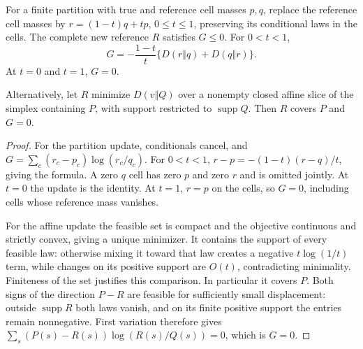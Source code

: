 \begin{lemma}\label{lem:v12-update}
For a finite partition with true and reference cell masses $p,q$, replace the reference
cell masses by $r=(1-t)q+tp$, $0\leq t\leq1$, preserving its conditional laws in the cells.
The complete new reference $R$ satisfies $G\leq0$. For $0<t<1$,
\[
 G=-\frac{1-t}{t}\{D(r\Vert q)+D(q\Vert r)\}.
\]
At $t=0$ and $t=1$, $G=0$.

Alternatively, let $R$ minimize $D(v\Vert Q)$ over a nonempty closed affine slice of
the simplex containing $P$, with support restricted to $\operatorname{supp}Q$.
Then $R$ covers $P$ and $G=0$.
\end{lemma}
\begin{proof}
For the partition update, conditionals cancel, and
$G=\sum_c(r_c-p_c)\log(r_c/q_c)$.
For $0<t<1$, $r-p=-(1-t)(r-q)/t$, giving the formula. A zero $q$ cell has zero
$p$ and zero $r$ and is omitted jointly. At $t=0$ the update is the identity.
At $t=1$, $r=p$ on the cells, so $G=0$, including cells whose reference mass vanishes.

For the affine update the feasible set is compact and the objective continuous and
strictly convex, giving a unique minimizer. It contains the support of every feasible
law: otherwise mixing it toward that law creates a negative $t\log(1/t)$ term, while
changes on its positive support are $O(t)$, contradicting minimality. Finiteness of the
set justifies this comparison. In particular it covers $P$.
Both signs of the direction $P-R$ are feasible for sufficiently small displacement:
outside $\operatorname{supp}R$ both laws vanish, and on its finite positive support the
entries remain nonnegative. First variation therefore gives
$\sum_s(P(s)-R(s))\log(R(s)/Q(s))=0$, which is $G=0$.
\end{proof}

